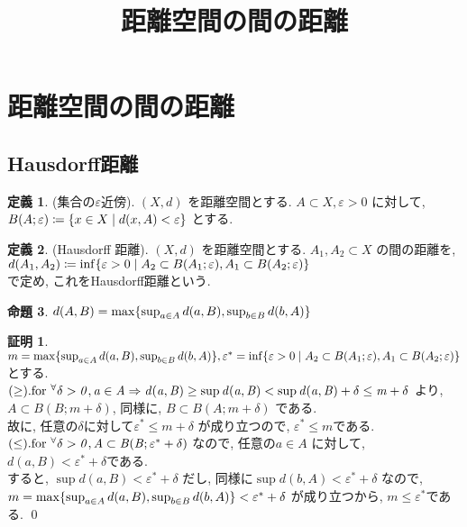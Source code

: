 \documentclass[10pt, fleqn, label-section=none, titlepage]{bxjsarticle}
\title{距離空間の間の距離}
\author{}
\date{}
\theoremstyle{definition}
\newtheorem{dfn}{定義}[section]
\newtheorem{prop}[dfn]{命題}
\newtheorem*{pf*}{証明}
\newcommand{\forany}{\rm{for} \ {}^{\forall}}
\newcommand{\veps}{\varepsilon}
\newcommand{\cbra}[1]{\mleft\{#1\mright\}}
\newcommand{\naraba}{\Rightarrow}
\begin{document}
\maketitle
\scriptsize 








\section{距離空間の間の距離}
\subsection{Hausdorff距離}
\begin{dfn}(集合の$\veps$近傍).
$(X,d)$ を距離空間とする. $A\subset X, \veps > 0$ に対して, \\
$B(A;\veps ) \coloneqq \cbra{x \in X \mid d(x, A) < \veps}$ とする.
\end{dfn}

\begin{dfn}(Hausdorff 距離).
$(X,d)$ を距離空間とする. $A_1, A_2  \subset X$ の間の距離を, \\
$d(A_1, A_2) \coloneqq \inf\cbra{\veps > 0 \mid A_2 \subset B(A_1 ; \veps ), A_1 \subset B(A_2 ; \veps) }$\\
で定め, これをHausdorff距離という.
\end{dfn}

\begin{prop}
$d(A,B) = \max \cbra{\sup_{a\in A} d(a,B) , \sup_{b \in B} d(b ,A) }$
\end{prop}
\begin{pf*}
$m = \max \cbra{\sup_{a\in A} d(a,B) , \sup_{b \in B} d(b ,A) }, \veps^* = \inf\cbra{\veps > 0 \mid A_2 \subset B(A_1 ; \veps ), A_1 \subset B(A_2 ; \veps) }$ とする. \\
$(\geq). \forany \it \delta >0 , a \in A \naraba d(a,B) \geq \sup d(a,B) < \sup d(a,B) + \delta \leq m + \delta $ より, $A \subset B(B;m+\delta)$, 同様に, $B \subset B(A;m+\delta)$ である. \\
故に, 任意の$\delta$に対して$\veps^* \leq m + \delta$ が成り立つので, $\veps^* \leq m$である. \\
$(\leq). \forany \it \delta >0, A \subset B(B; \veps^* + \delta)  $ なので, 任意の$a\in A$ に対して, $d(a,B) < \veps^* + \delta$である. \\
すると, $\sup d(a,B) < \veps^* + \delta$ だし, 同様に$\sup d(b,A) < \veps^* + \delta$ なので, \\
$m = \max \cbra{\sup_{a\in A} d(a,B) , \sup_{b \in B} d(b ,A) } < \veps^* + \delta$ が成り立つから, $m \leq \veps^*$である.
\qed
\end{pf*}
\end{document}
